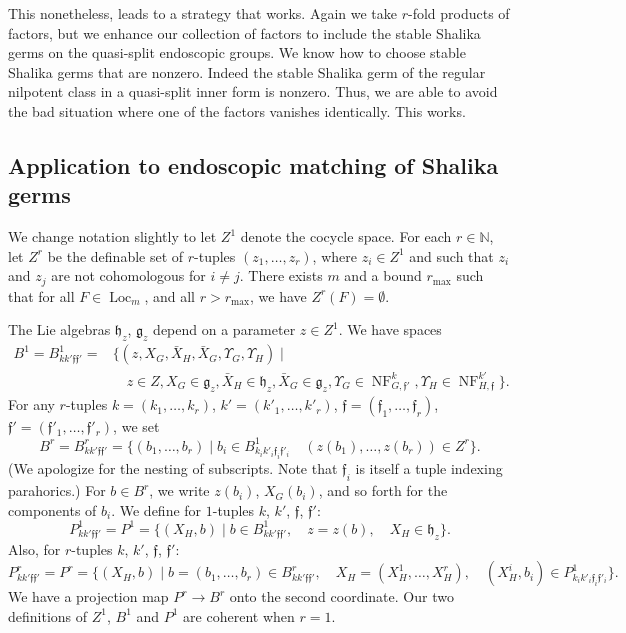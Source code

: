 \documentclass[12pt]{amsart}
\newcommand{\op}[1]{\operatorname{#1}}
\newcommand{\ring}[1]{{\mathbb #1}}
\def\NF{\op{NF}}
\def\Y{\Upsilon}
\def\s{{\mathfrak{f}}}
\newcommand{\fg}{\mathfrak{g}}
\newcommand{\fh}{\mathfrak{h}}
\theoremstyle{plain}
\theoremstyle{definition}
\begin{document}
This nonetheless, leads to a strategy that works.  Again we take
$r$-fold products of factors, but we enhance our collection of factors
to include the stable Shalika germs on the quasi-split endoscopic
groups.  We know how to choose stable Shalika germs that are nonzero.
Indeed the stable Shalika germ of the regular nilpotent class in a
quasi-split inner form is
nonzero.  Thus, we are able to avoid the bad situation where one of
the factors vanishes identically.  This works.

\subsection{Application to endoscopic matching of Shalika germs}

We change notation slightly to let $Z^1$ denote the
cocycle space.  For each $r\in\ring{N}$, let $Z^r$ be the definable
set of $r$-tuples $(z_1,\ldots,z_r)$, where $z_i \in Z^1$ and such
that $z_i$ and $z_j$ are not cohomologous for $i\ne j$.  There exists
$m$ and a bound $r_{\op{max}}$ such that for all $F\in \op{Loc}_m$,
and all $r> r_{\op{max}}$, we have $Z^r(F) = \emptyset$.

The Lie algebras $\fh_z$, $\fg_z$ depend on a parameter $z\in Z^1$.
We have spaces
\begin{align*}
B^1 = B^1_{kk'\s \s'} = &\{(z,X_G,\bar X_H,\bar X_G,\Y_G,\Y_H) \mid \\
     &\quad z\in Z, X_G\in \fg_z,
\bar X_H \in \fh_z, \bar X_G\in \fg_z, \Y_G\in \NF^k_{G,\s'}, \Y_H\in \NF^{k'}_{H,\s}\}.
\end{align*}
For any $r$-tuples $k=(k_1,\ldots,k_r)$, $k'=(k'_1,\ldots,k'_r)$,
$\s = (\s_1,\ldots,\s_r)$, $\s'=(\s'_1,\ldots,\s'_r)$, we set
\[
B^r = B^r_{kk'\s \s'} = \{(b_1,\ldots,b_r) \mid b_i \in B^1_{k_ik'_i\s_i\s'_i}\quad
  (z(b_1),\ldots,z(b_r))\in Z^r \}.
\]
(We apologize for the nesting of subscripts.  Note that $\s_i$ is
itself a tuple indexing parahorics.)  For $b\in B^r$, we write
$z(b_i)$, $X_G(b_i)$, and so forth for the components of $b_i$.  We
define for $1$-tuples $k$, $k'$, $\s$, $\s'$:
\[
P^1_{kk'\s \s'} = P^1 = \{(X_H,b) \mid b\in B^1_{kk'\s \s'},
\quad z = z(b),\quad X_H \in \fh_z\}.
\]
Also, for $r$-tuples $k$, $k'$, $\s$, $\s'$:
\[
P^r_{kk'\s \s'} = P^r = \{(X_H,b) \mid b = (b_1,\ldots,b_r)\in B^r_{kk'\s \s'},\quad
  X_H = (X_H^1,\ldots,X_H^r), \quad (X_H^i,b_i) \in P^1_{k_ik'_i\s_i\s'_i}\}.
\]
We have a projection map $P^r\to B^r$ onto the second coordinate.
Our two definitions of $Z^1$, $B^1$ and $P^1$ are coherent when
$r=1$.
\end{document}
